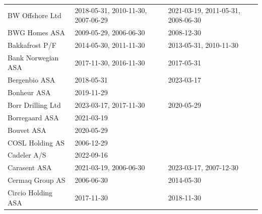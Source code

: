 \begin{table}[H]
\begin{tabularx}{\textwidth}{XXX}
BW Offshore Ltd & 2018-05-31, 2010-11-30, 2007-06-29 & 2021-03-19, 2011-05-31, 2008-06-30 \\ 
BWG Homes ASA & 2009-05-29, 2006-06-30 & 2008-12-30 \\ 
Bakkafrost P/F & 2014-05-30, 2011-11-30 & 2013-05-31, 2010-11-30 \\ 
Bank Norwegian ASA & 2017-11-30, 2016-11-30 & 2017-05-31 \\ 
Bergenbio ASA & 2018-05-31 & 2023-03-17 \\ 
Bonheur ASA & 2019-11-29 &  \\ 
Borr Drilling Ltd & 2023-03-17, 2017-11-30 & 2020-05-29 \\ 
Borregaard ASA & 2021-03-19 &  \\ 
Bouvet ASA & 2020-05-29 &  \\ 
COSL Holding AS & 2006-12-29 &  \\ 
Cadeler A/S & 2022-09-16 &  \\ 
Carasent ASA & 2021-03-19, 2006-06-30 & 2023-03-17, 2007-12-30 \\ 
Cermaq Group AS & 2006-06-30 & 2014-05-30 \\ 
Circio Holding ASA & 2017-11-30 & 2018-11-30 \\ 
\bottomrule
\end{tabularx}
\end{table}
\newpage
\clearpage


